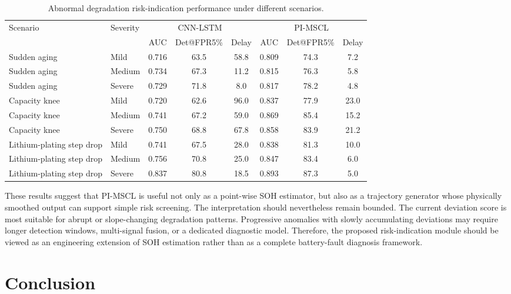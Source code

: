 \documentclass[a4paper,fleqn]{cas-dc}
\begin{document}
\begin{table}[t]
\caption{Abnormal degradation risk-indication performance under different scenarios.}
\label{tab:risk_detection}
\centering
\begin{tabular}{llcccccc}
\toprule
Scenario & Severity & \multicolumn{3}{c}{CNN-LSTM} & \multicolumn{3}{c}{PI-MSCL} \\
\cmidrule(lr){3-5}\cmidrule(lr){6-8}
 & & AUC & Det@FPR5\% & Delay & AUC & Det@FPR5\% & Delay \\
\midrule
Sudden aging & Mild & 0.716 & 63.5 & 58.8 & 0.809 & 74.3 & 7.2 \\
Sudden aging & Medium & 0.734 & 67.3 & 11.2 & 0.815 & 76.3 & 5.8 \\
Sudden aging & Severe & 0.729 & 71.8 & 8.0 & 0.817 & 78.2 & 4.8 \\
Capacity knee & Mild & 0.720 & 62.6 & 96.0 & 0.837 & 77.9 & 23.0 \\
Capacity knee & Medium & 0.741 & 67.2 & 59.0 & 0.869 & 85.4 & 15.2 \\
Capacity knee & Severe & 0.750 & 68.8 & 67.8 & 0.858 & 83.9 & 21.2 \\
Lithium-plating step drop & Mild & 0.741 & 67.5 & 28.0 & 0.838 & 81.3 & 10.0 \\
Lithium-plating step drop & Medium & 0.756 & 70.8 & 25.0 & 0.847 & 83.4 & 6.0 \\
Lithium-plating step drop & Severe & 0.837 & 80.8 & 18.5 & 0.893 & 87.3 & 5.0 \\
\bottomrule
\end{tabular}
\end{table}

These results suggest that PI-MSCL is useful not only as a point-wise SOH estimator, but also as a trajectory generator whose physically smoothed output can support simple risk screening. The interpretation should nevertheless remain bounded. The current deviation score is most suitable for abrupt or slope-changing degradation patterns. Progressive anomalies with slowly accumulating deviations may require longer detection windows, multi-signal fusion, or a dedicated diagnostic model. Therefore, the proposed risk-indication module should be viewed as an engineering extension of SOH estimation rather than as a complete battery-fault diagnosis framework.

\fi

\section{Conclusion}
\label{sec:conclusion}
\end{document}
